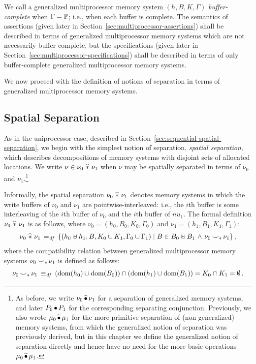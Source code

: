 \documentclass[11pt]{report}
\begin{document}
We call a generalized multiprocessor memory system $(h,B,K,\Gamma)$ \emph{buffer-complete} when $\Gamma = \mathbb{P}$; i.e., when each buffer is complete. The semantics of assertions (given later in Section~\ref{sec:multiprocessor-assertions}) shall be described in terms of generalized multiprocessor memory systems which are not necessarily buffer-complete, but the specifications (given later in Section~\ref{sec:multiprocessor-specifications}) shall be described in terms of only buffer-complete generalized multiprocessor memory systems.

We now proceed with the definition of notions of separation in terms of generalized multiprocessor memory systems. 

\subsection{Spatial Separation}
\label{sec:spatial-separation}

As in the uniprocessor case, described in Section~\ref{sec:sequential-spatial-separation}, we begin with the simplest notion of separation, \emph{spatial separation}, which describes decompositions of memory systems with disjoint sets of allocated locations. We write $\nu \in \nu_0 \operatorname{\,\widehat{\ast}\,} \nu_1$ when $\nu$ may be spatially separated in terms of $\nu_0$ and $\nu_1$.\footnote{As before, we write $\nu_0 \operatorname{\widehat{\bullet}} \nu_1$ for a separation of generalized memory systems, and later $P_0 \operatorname{\bullet} P_1$ for the corresponding separating conjunction. Previously, we also wrote $\mu_0 \operatorname{\widetilde{\bullet}} \mu_1$ for the more primitive separation of (non-generalized) memory systems, from which the generalized notion of separation was previously derived, but in this chapter we define the generalized notion of separation directly and hence have no need for the more basic operations $\mu_0 \operatorname{\widetilde{\bullet}} \mu_1$.} 

Informally, the spatial separation $\nu_0 \operatorname{\,\widehat{\ast}\,} \nu_1$ denotes memory systems in which the write buffers of $\nu_0$ and $\nu_1$ are pointwise-interleaved: i.e., the $i$th buffer is some interleaving of the $i$th buffer of $\nu_0$ and the $i$th buffer of $nu_1$. The formal definition $\nu_0 \operatorname{\,\widehat{\ast}\,} \nu_1$ is as follows, where $\nu_0 = (h_0,B_0,K_0,\Gamma_0)$ and $\nu_1 = (h_1,B_1,K_1,\Gamma_1)$: \[ \nu_0 \operatorname{\,\widehat{\ast}\,} \nu_1 \operatorname{\;=_{\mathit{df}}\;} \left\lbrace (h_0 \uplus h_1, B, K_0 \cup K_1, \Gamma_0 \cup \Gamma_1) \mid B \in B_0 \uplus B_1 \operatorname{\,\wedge\,} \nu_0 \operatorname{\smile}_\ast \nu_1 \right\rbrace,\] where the compatibility relation between generalized multiprocessor memory systems $\nu_0 \operatorname{\smile}_\ast \nu_1$ is defined as follows: \[ \nu_0 \operatorname{\smile}_\ast \nu_1 \operatorname{\;\equiv_{\mathit{df}}\;} \left(\operatorname{\mathrm{dom}}(h_0) \cup \operatorname{\mathrm{dom}}(B_0) \right) \cap \left( \operatorname{\mathrm{dom}}(h_1) \cup \operatorname{\mathrm{dom}}(B_1) \right) = K_0 \cap K_1 = \operatorname{\emptyset}.\] 
\end{document}
